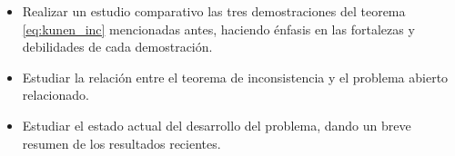\documentclass[12pt]{article}
\begin{document}
    \begin{itemize}
        \item Realizar un estudio comparativo las tres demostraciones del teorema \ref{eq:kunen_inc} mencionadas antes,
        haciendo énfasis en las fortalezas y debilidades de cada demostración.
        \item Estudiar la relación entre el teorema de inconsistencia y el problema abierto relacionado.
        \item Estudiar el estado actual del desarrollo del problema, dando un breve resumen de los resultados recientes. 
    \end{itemize}

    \nocite{jech_set_2003}
    \nocite{kanamori_mathematical_1996}
    \singlespacing
    \sloppy
    \printbibliography[heading=mybib]
\end{document}
